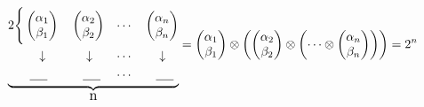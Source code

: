 \documentclass[12pt]{report}
\begin{document}
\begin{align*}
\underbrace{
\begin{alignedat}{2}
2 \Bigg\{ \begin{pmatrix} \alpha_1 \\ \beta_1 \end{pmatrix} &\quad \begin{pmatrix} \alpha_2 \\ \beta_2 \end{pmatrix} &\quad  \cdots &\quad \begin{pmatrix} \alpha_n \\ \beta_n \end{pmatrix}\\
\downarrow\quad &\qquad \downarrow &\quad \cdots &\qquad \downarrow \\ 
\underline{\hspace{5mm}} \hspace{3mm} &\qquad \underline{\hspace{5mm}} & \quad \cdots & \qquad \underline{\hspace{5mm}}
\end{alignedat}
}_{\text{\begin{large}n\end{large}}} &=
\begin{pmatrix} \alpha_1 \\ \beta_1 \end{pmatrix} \otimes \left(\begin{pmatrix} \alpha_2 \\ \beta_2 \end{pmatrix} \otimes\left(\cdots \otimes \begin{pmatrix} \alpha_n \\ \beta_n \end{pmatrix}\right)\right)
 = 2^n
\end{align*}\\
\end{document}
